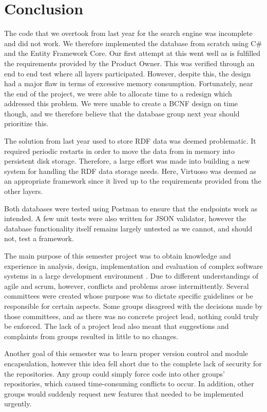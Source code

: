 \chapter{Conclusion}\label{ch:conclusion}
The code that we overtook from last year for the search engine was incomplete and did not work.
We therefore implemented the database from scratch using C\# and the Entity Framework Core.
Our first attempt at this went well as is fulfilled the requirements provided by the Product Owner. 
This was verified through an end to end test where all layers participated.
However, despite this, the design had a major flaw in terms of excessive memory consumption. 
Fortunately, near the end of the project, we were able to allocate time to a redesign which addressed this problem.
We were unable to create a BCNF design on time though, and we therefore believe that the database group next year should prioritize this.

The solution from last year used to store RDF data was deemed problematic.
It required periodic restarts in order to move the data from in memory into persistent disk storage.
Therefore, a large effort was made into building a new system for handling the \knox{} RDF data storage needs. 
Here, Virtuoso was deemed as an appropriate framework since it lived up to the requirements provided from the other layers. 

Both databases were tested using Postman to ensure that the endpoints work as intended.
A few unit tests were also written for JSON validator, however the database functionality itself remains largely untested as we cannot, and should not, test a framework.

The main purpose of this semester project was to obtain knowledge and experience in analysis, design, implementation and evaluation of complex software systems in a large development environment \cite{AAULearningGoals5thSemester}.
Due to different understandings of agile and scrum, however, conflicts and problems arose intermittently.
Several committees were created whose purpose was to dictate specific guidelines or be responsible for certain aspects.
Some groups disagreed with the decisions made by those committees, and as there was no concrete project lead, nothing could truly be enforced. 
The lack of a project lead also meant that suggestions and complaints from groups resulted in little to no changes.


Another goal of this semester was to learn proper version control and module encapsulation, however this idea fell short due to the complete lack of security for the \knox{} repositories. 
Any group could simply force code into other groups' repositories, which caused time-consuming conflicts to occur.
In addition, other groups would suddenly request new features that needed to be implemented urgently.


